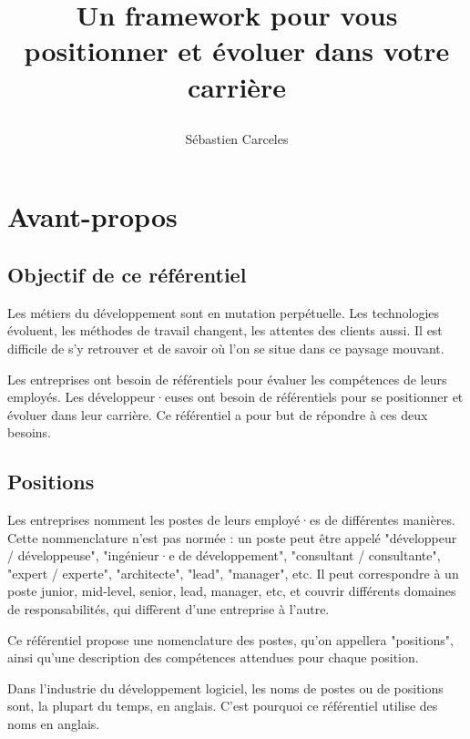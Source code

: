 \documentclass[a4paper, french, openany, 12pt]{book}
\title{
  \vspace*{-8cm}

  \fullwidthimage{images/cover.jpg}

  \vspace*{5cm}

  \bsc{Référenciel de compétences pour développeurs et développeuses}

  Un framework pour vous positionner et évoluer dans votre carrière
}
\author{Sébastien Carceles}
\date{}
\begin{document}
\begin{titlepage}
  \maketitle
\end{titlepage}

\frontmatter

\chapter{Avant-propos}

\begin{multicols}{2}
  
  \section*{Objectif de ce référentiel}
  
  Les métiers du développement sont en mutation perpétuelle.
  Les technologies évoluent, les méthodes de travail changent, les attentes des clients aussi.
  Il est difficile de s'y retrouver et de savoir où l'on se situe dans ce paysage mouvant.
  
  Les entreprises ont besoin de référentiels pour évaluer les compétences de leurs employés.
  Les développeur·euses ont besoin de référentiels pour se positionner et évoluer dans leur carrière.
  Ce référentiel a pour but de répondre à ces deux besoins.
  
  \section*{Positions}
  
  Les entreprises nomment les postes de leurs employé·es de différentes manières.
  Cette nommenclature n'est pas normée : un poste peut être appelé "développeur / développeuse", "ingénieur·e de 
  développement", "consultant / consultante", "expert / experte", "architecte", "lead", "manager", etc.
  Il peut correspondre à un poste junior, mid-level, senior, lead, manager, etc, et couvrir différents domaines de 
  responsabilités, qui diffèrent d'une entreprise à l'autre.
  
  Ce référentiel propose une nomenclature des postes, qu'on appellera "positions",
  ainsi qu'une description des compétences attendues pour chaque position.
  
  Dans l'industrie du développement logiciel, les noms de postes ou de positions sont, la plupart du temps, en anglais.
  C'est pourquoi ce référentiel utilise des noms en anglais.
  

\end{multicols}
\end{document}
